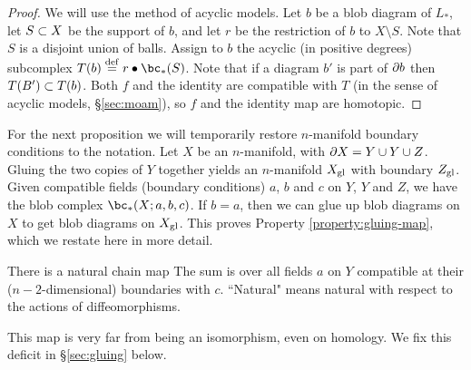 \begin{proof}
We will use the method of acyclic models.
Let $b$ be a blob diagram of $L_*$, let $S\subset X$ be the support of $b$, and let
$r$ be the restriction of $b$ to $X\setminus S$.
Note that $S$ is a disjoint union of balls.
Assign to $b$ the acyclic (in positive degrees) subcomplex $T(b) \deq r\bullet\bc_*(S)$.
Note that if a diagram $b'$ is part of $\partial b$ then $T(B') \subset T(b)$.
Both $f$ and the identity are compatible with $T$ (in the sense of acyclic models, \S\ref{sec:moam}), 
so $f$ and the identity map are homotopic.
\end{proof}

For the next proposition we will temporarily restore $n$-manifold boundary
conditions to the notation. Let $X$ be an $n$-manifold, with $\partial X = Y \cup Y \cup Z$.
Gluing the two copies of $Y$ together yields an $n$-manifold $X_\mathrm{gl}$
with boundary $Z_\mathrm{gl}$.
Given compatible fields (boundary conditions) $a$, $b$ and $c$ on $Y$, $Y$ and $Z$,
we have the blob complex $\bc_*(X; a, b, c)$.
If $b = a$, then we can glue up blob diagrams on
$X$ to get blob diagrams on $X_\mathrm{gl}$.
This proves Property \ref{property:gluing-map}, which we restate here in more detail.

\begin{prop} \label{blob-gluing}
There is a natural chain map
The sum is over all fields $a$ on $Y$ compatible at their
($n{-}2$-dimensional) boundaries with $c$.
``Natural" means natural with respect to the actions of diffeomorphisms.
\end{prop}

This map is very far from being an isomorphism, even on homology.
We fix this deficit in \S\ref{sec:gluing} below.
